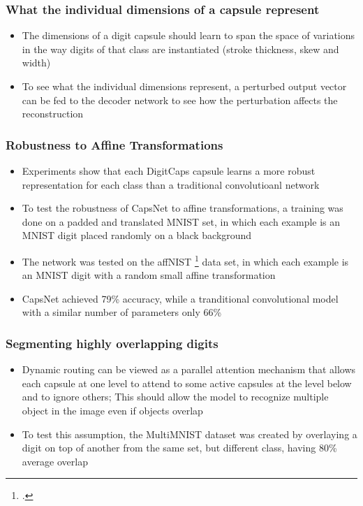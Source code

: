 \documentclass{beamer}
\begin{document}
\begin{frame}
\frametitle{What the individual dimensions of a capsule represent}
\begin{itemize}
	\item The dimensions of a digit capsule should learn to span the space of variations in the way digits of that class are instantiated (stroke thickness, skew and width)
	\item To see what the individual dimensions represent, a perturbed output vector can be fed to the decoder network to see how the perturbation affects the reconstruction
\end{itemize}
\begin{figure}
    \centering
    \end{figure}
\end{frame}

\begin{frame}
\frametitle{Robustness to Affine Transformations}
\begin{itemize}
	\item Experiments show that each DigitCaps capsule learns a more robust representation for each class than a traditional convolutioanl network
	\item To test the robustness of CapsNet to affine transformations, a training was done on a padded and translated MNIST set, in which each example is an MNIST digit placed randomly on a black 				  background
	\item The network was tested on the affNIST \footcite{affNIST} data set, in which each example is an MNIST digit with a random small affine transformation
	\item CapsNet achieved 79\% accuracy, while a tranditional convolutional model with a similar number of parameters only 66\%
\end{itemize}
\end{frame}

\begin{frame}
\frametitle{Segmenting highly overlapping digits}
\begin{itemize}
	\item Dynamic routing can be viewed as a parallel attention mechanism that allows each capsule at one level to attend to some active capsules at the level below and to ignore others; This should allow the model to recognize multiple object in the image even if objects overlap
	\item To test this assumption, the MultiMNIST dataset was created by overlaying a digit on top of another from the same set, but different class, having 80\% average overlap
\end{itemize}
\end{frame}
\end{document}
